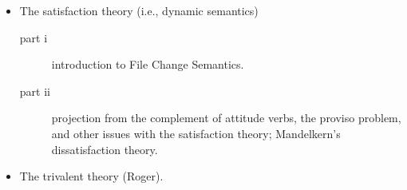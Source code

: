 \documentclass[cronos,landscape,paper=letter]{ling-handout}
\begin{document}
\begin{itemize}

    \item The satisfaction theory (i.e., dynamic semantics)

    \begin{description}

        \item[part i]introduction to File Change Semantics.

      \item[part ii]projection from the complement of attitude verbs, the proviso problem, and other issues with the satisfaction theory; Mandelkern's dissatisfaction theory.

    \end{description}

    \item The trivalent theory (Roger).

\end{itemize}

\printbibliography
\end{document}
